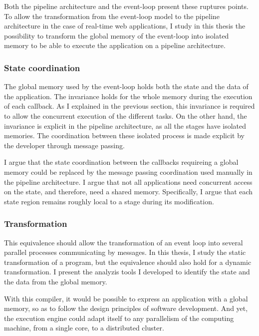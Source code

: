 Both the pipeline architecture and the event-loop present these ruptures points.
To allow the transformation from the event-loop model to the pipeline architecture in the case of real-time web applications, I study in this thesis the possibility to transform the global memory of the event-loop into isolated memory to be able to execute the application on a pipeline architecture.

\subsubsection{State coordination}

The global memory used by the event-loop holds both the state and the data of the application.
The invariance holds for the whole memory during the execution of each callback.
As I explained in the previous section, this invariance is required to allow the concurrent execution of the different tasks.
On the other hand, the invariance is explicit in the pipeline architecture, as all the stages have isolated memories.
The coordination between these isolated process is made explicit by the developer through message passing.

I argue that the state coordination between the callbacks requireing a global memory could be replaced by the message passing coordination used manually in the pipeline architecture.
I argue that not all applications need concurrent access on the state, and therefore, need a shared memory.
Specifically, I argue that each state region remains roughly local to a stage during its modification.

\subsubsection{Transformation}

This equivalence should allow the transformation of an event loop into several parallel processes communicating by messages.
In this thesis, I study the static transformation of a program, but the equivalence should also hold for a dynamic transformation.
I present the analyzis tools I developed to identify the state and the data from the global memory.

With this compiler, it would be possible to express an application with a global memory, so as to follow the design principles of software development.
And yet, the execution engine could adapt itself to any parallelism of the computing machine, from a single core, to a distributed cluster.

